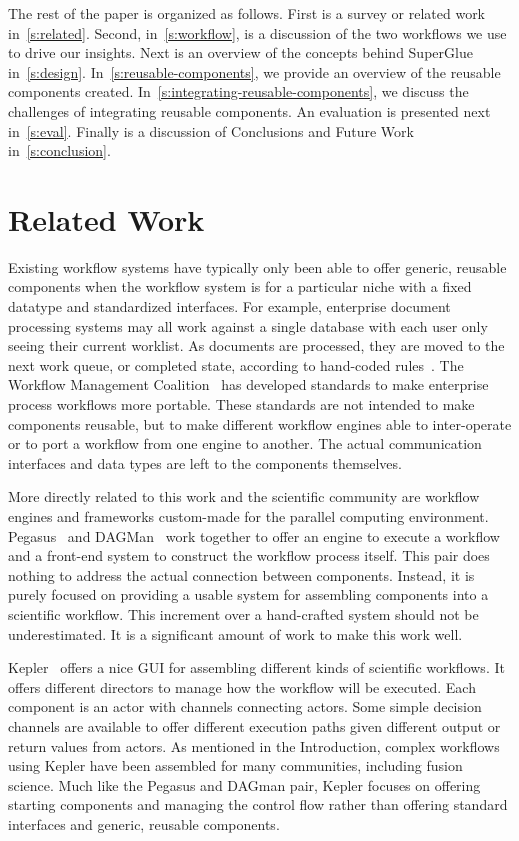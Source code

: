 \documentclass[conference]{IEEEtran}
\begin{document}
The rest of the paper is organized as follows. First is a survey or related
work in~\autoref{s:related}. Second, in~\autoref{s:workflow}, is a
discussion of the two workflows we use to drive our insights. Next is an
overview of the concepts behind SuperGlue in~\autoref{s:design}.
In~\autoref{s:reusable-components}, we provide an overview of the reusable
components created. In~\autoref{s:integrating-reusable-components}, we
discuss the challenges of integrating reusable components.  An evaluation is
presented next in~\autoref{s:eval}. Finally is a discussion of Conclusions
and Future Work in~\autoref{s:conclusion}.

\section{Related Work}
\label{s:related}

Existing workflow systems have typically only been able to offer generic,
reusable components when the workflow system is for a particular niche with a
fixed datatype and standardized interfaces. For example, enterprise document
processing systems may all work against a single database with each user only
seeing their current worklist. As documents are processed, they are moved to
the next work queue, or completed state, according to hand-coded
rules~\cite{mckesson-workflow}. The Workflow Management Coalition~\cite{wfmc}
has developed standards to make enterprise process workflows more portable.
These standards are not intended to make components reusable, but to make
different workflow engines able to inter-operate or to port a workflow from one
engine to another.  The actual communication interfaces and data types are left
to the components themselves.

More directly related to this work and the scientific community are workflow
engines and frameworks custom-made for the parallel computing environment.
Pegasus~\cite{mullender:pegasus} and DAGMan~\cite{Malewicz:2006:dagman} work
together to offer an engine to execute a workflow and a front-end system to
construct the workflow process itself. This pair does nothing to address the
actual connection between components. Instead, it is purely focused on
providing a usable system for assembling components into a scientific workflow.
This increment over a hand-crafted system should not be underestimated. It is a
significant amount of work to make this work well.

Kepler~\cite{bertram:2006:kepler} offers a nice GUI for assembling different
kinds of scientific workflows. It offers different directors to manage how the
workflow will be executed. Each component is an actor with channels connecting
actors. Some simple decision channels are available to offer different
execution paths given different output or return values from actors. As
mentioned in the Introduction, complex workflows using Kepler have been
assembled for many communities, including fusion science. Much like the Pegasus
and DAGman pair, Kepler focuses on offering starting components and managing
the control flow rather than offering standard interfaces and generic, reusable
components.
\end{document}

